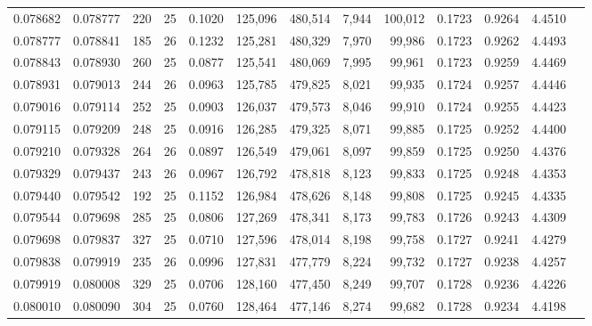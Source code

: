 \begin{tabular}{rrrrrrrrrrrrr}
0.078682 & 0.078777 & 220 &  25 &                                     0.1020 & 125,096 & 480,514 &   7,944 & 100,012 & 0.1723 & 0.9264 & 4.4510 \\
0.078777 & 0.078841 & 185 &  26 &                                     0.1232 & 125,281 & 480,329 &   7,970 &  99,986 & 0.1723 & 0.9262 & 4.4493 \\
0.078843 & 0.078930 & 260 &  25 &                                     0.0877 & 125,541 & 480,069 &   7,995 &  99,961 & 0.1723 & 0.9259 & 4.4469 \\
0.078931 & 0.079013 & 244 &  26 &                                     0.0963 & 125,785 & 479,825 &   8,021 &  99,935 & 0.1724 & 0.9257 & 4.4446 \\
0.079016 & 0.079114 & 252 &  25 &                                     0.0903 & 126,037 & 479,573 &   8,046 &  99,910 & 0.1724 & 0.9255 & 4.4423 \\
0.079115 & 0.079209 & 248 &  25 &                                     0.0916 & 126,285 & 479,325 &   8,071 &  99,885 & 0.1725 & 0.9252 & 4.4400 \\
0.079210 & 0.079328 & 264 &  26 &                                     0.0897 & 126,549 & 479,061 &   8,097 &  99,859 & 0.1725 & 0.9250 & 4.4376 \\
0.079329 & 0.079437 & 243 &  26 &                                     0.0967 & 126,792 & 478,818 &   8,123 &  99,833 & 0.1725 & 0.9248 & 4.4353 \\
0.079440 & 0.079542 & 192 &  25 &                                     0.1152 & 126,984 & 478,626 &   8,148 &  99,808 & 0.1725 & 0.9245 & 4.4335 \\
0.079544 & 0.079698 & 285 &  25 &                                     0.0806 & 127,269 & 478,341 &   8,173 &  99,783 & 0.1726 & 0.9243 & 4.4309 \\
0.079698 & 0.079837 & 327 &  25 &                                     0.0710 & 127,596 & 478,014 &   8,198 &  99,758 & 0.1727 & 0.9241 & 4.4279 \\
0.079838 & 0.079919 & 235 &  26 &                                     0.0996 & 127,831 & 477,779 &   8,224 &  99,732 & 0.1727 & 0.9238 & 4.4257 \\
0.079919 & 0.080008 & 329 &  25 &                                     0.0706 & 128,160 & 477,450 &   8,249 &  99,707 & 0.1728 & 0.9236 & 4.4226 \\
0.080010 & 0.080090 & 304 &  25 &                                     0.0760 & 128,464 & 477,146 &   8,274 &  99,682 & 0.1728 & 0.9234 & 4.4198 \\

\end{tabular}
